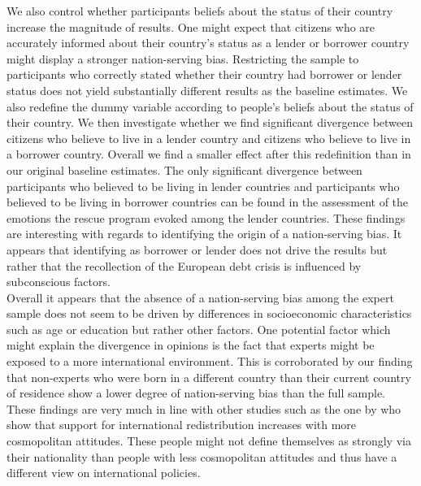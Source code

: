 We also control whether participants beliefs about the status of their country increase the magnitude of results. One might expect that citizens who are accurately informed about their country's status as a lender or borrower country might display a stronger nation-serving bias. Restricting the sample to participants who correctly stated whether their country had borrower or lender status does not yield substantially different results as the baseline estimates. We also redefine the dummy variable according to people's beliefs about the status of their country. We then investigate whether we find significant divergence between citizens who believe to live in a lender country and citizens who believe to live in a borrower country. Overall we find a smaller effect after this redefinition than in our original baseline estimates. The only significant divergence between participants who believed to be living in lender countries and participants who believed to be living in borrower countries can be found in the assessment of the emotions the rescue program evoked among the lender countries. These findings are interesting with regards to identifying the origin of a nation-serving bias. It appears that identifying as borrower or lender does not drive the results but rather that the recollection of the European debt crisis is influenced by subconscious factors. 
\\
Overall it appears that the absence of a nation-serving bias among the expert sample does not seem to be driven by differences in socioeconomic characteristics such as age or education but rather other factors. One potential factor which might explain the divergence in opinions is the fact that experts might be exposed to a more international environment. This is corroborated by our finding that non-experts who were born in a different country than their current country of residence show a lower degree of nation-serving bias than the full sample. These findings are very much in line with other studies such as the one by \cite{bechtel} who show that support for international redistribution increases with more cosmopolitan attitudes. These people might not define themselves as strongly via their nationality than people with less cosmopolitan attitudes and thus have a different view on international policies. 

